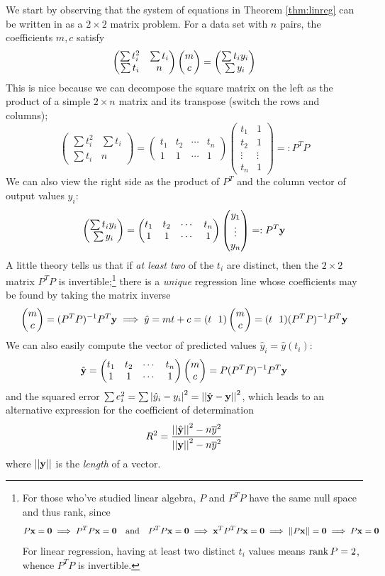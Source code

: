 We start by observing that the system of equations in Theorem \ref{thm:linreg} can be written in as a $2\times 2$ matrix problem. For a data set with $n$ pairs, the coefficients $m,c$ satisfy
\[
	\begin{pmatrix}
		\sum t_i^2&\sum t_i\\
		\sum t_i&n
	\end{pmatrix}
	\begin{pmatrix}m\\c\end{pmatrix}=\begin{pmatrix}\sum t_iy_i\\\sum y_i\end{pmatrix}
\]
This is nice because we can decompose the square matrix on the left as the product of a simple $2\times n$ matrix and its transpose (switch the rows and columns);
\[
	\begin{pmatrix}
		\sum t_i^2&\sum t_i\\
		\sum t_i&n
	\end{pmatrix}
	=
	\begin{pmatrix}
		t_1&t_2&\cdots&t_n\\
		1&1&\cdots&1
	\end{pmatrix}
	\begin{pmatrix}
		t_1&1\\
		t_2&1\\
		\vdots&\vdots\\
		t_n&1
	\end{pmatrix}
	=:P^TP
\]
We can also view the right side as the product of $P^T$ and the column vector of output values $y_i$:
\[
	\begin{pmatrix}\sum t_iy_i\\\sum y_i\end{pmatrix}=
	\begin{pmatrix}
		t_1&t_2&\cdots&t_n\\
		1&1&\cdots&1
	\end{pmatrix}
	\begin{pmatrix}y_1\\\vdots\\y_n\end{pmatrix}=:P^T{\mathbf{y}}
\]
A little theory tells us that if \emph{at least two} of the $t_i$ are distinct, then the $2\times 2$ matrix $P^TP$ is invertible;\footnote{%
For those who've studied linear algebra, $P$ and $P^TP$ have the same null space and thus rank, since
	\[
		P{\mathbf{x}}=\mathbf{0}\implies P^TP{\mathbf{x}}=\mathbf{0}\quad\text{and}\quad P^TP{\mathbf{x}}=\mathbf{0}\implies {\mathbf{x}}^TP^TP{\mathbf{x}}=\mathbf{0}\implies \left| \left| P{\mathbf{x}}\right|\right|=\mathbf{0}\implies P{\mathbf{x}}=\mathbf{0}
	\]
	For linear regression, having at least two distinct $t_i$ values means $\operatorname{rank} P=2$, whence $P^TP$ is invertible.
}
there is a \emph{unique} regression line whose coefficients may be found by taking the matrix inverse
\[
	\twovec mc=(P^TP)^{-1}P^T\vy \implies \hat y=mt+c=(t\ \ 1)\twovec mc=(t\ \ 1)(P^TP)^{-1}P^T\vy
\]
We can also easily compute the vector of predicted values $\hat y_i=\hat y(t_i)$:
\[
	\hat{{\mathbf{y}}}=
	\begin{pmatrix}
		t_1&t_2&\cdots&t_n\\
		1&1&\cdots&1
	\end{pmatrix}
	\begin{pmatrix}m\\c\end{pmatrix}=P(P^TP)^{-1}P^T{\mathbf{y}}
\]
and the squared error $\sum e_i^2=\sum\left| \hat y_i-y_i\right|^2=\left| \left| \hat{{\mathbf{y}}}-{\mathbf{y}}\right|\right|^2$, which leads to an alternative expression for the coefficient of determination
\[
	R^2=\frac{\left| \left| \hat{{\mathbf{y}}}\right|\right|^2-n\overline{y}^2}{\left| \left| {\mathbf{y}}\right|\right|^2-n\overline{y}^2}
\]
where $\left| \left| {\mathbf{y}}\right|\right|$ is the \emph{length} of a vector.

